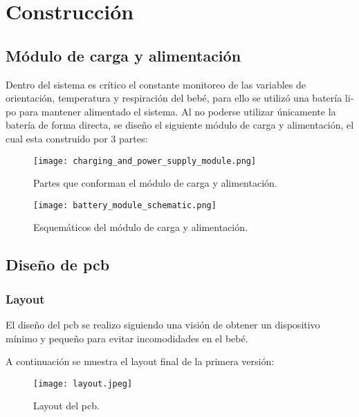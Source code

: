 \section{Construcción}

\subsection{Módulo de carga y alimentación}

Dentro del sistema es crítico el constante monitoreo de las variables de orientación,
temperatura y respiración del bebé, para ello se utilizó una batería \acrshort{li-po} para mantener
alimentado el sistema. Al no poderse utilizar únicamente la batería de forma directa, se
diseño el siguiente módulo de carga y alimentación, el cual esta construido por 3 partes:

\begin{figure}[htp!]
    \centering
    \texttt{[image: charging\_and\_power\_supply\_module.png]}
    \caption{Partes que conforman el módulo de carga y alimentación.}
    \label{fig: charging_and_power_module}
\end{figure}
\FloatBarrier

\begin{figure}[htp!]
    \centering
    \texttt{[image: battery\_module\_schematic.png]}
    \caption{Esquemáticos del módulo de carga y alimentación.}
    \label{fig: battery_module_schematic}
\end{figure}
\FloatBarrier

\subsection{Diseño de \acrshort{pcb}}

\subsubsection{Layout}
El diseño del \acrshort{pcb} se realizo siguiendo una visión de obtener un dispositivo
mínimo y pequeño para evitar incomodidades en el bebé.

A continuación se muestra el layout final de la primera versión:

\begin{figure}[htp!]
    \centering
    \texttt{[image: layout.jpeg]}
    \caption{Layout del \acrshort{pcb}.}
    \label{fig: layout}
\end{figure}
\FloatBarrier

